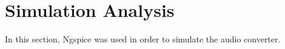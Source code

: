 \section{Simulation Analysis}
\label{sec:simulation}

In this section, Ngspice was used in order to simulate the audio converter.
